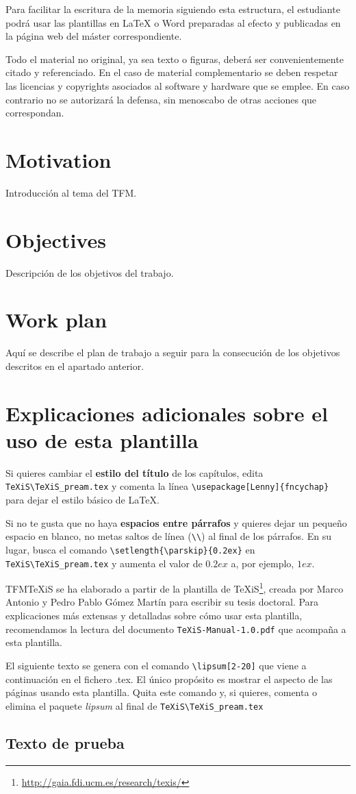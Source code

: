 Para facilitar la escritura de la memoria siguiendo esta estructura, el estudiante podrá usar las plantillas en LaTeX o Word preparadas al efecto y publicadas en la página web del máster correspondiente.

Todo el material no original, ya sea texto o figuras, deberá ser convenientemente citado y referenciado. En el caso de material complementario se deben respetar las licencias y copyrights asociados al software y hardware que se emplee. En caso contrario no se autorizará la defensa, sin menoscabo de otras acciones que correspondan.


\section{Motivation}
Introducción al tema del TFM.


\section{Objectives}
Descripción de los objetivos del trabajo.


\section{Work plan}
Aquí se describe el plan de trabajo a seguir para la consecución de los objetivos descritos en el apartado anterior.



\section{Explicaciones adicionales sobre el uso de esta plantilla}
Si quieres cambiar el \textbf{estilo del título} de los capítulos, edita \verb|TeXiS\TeXiS_pream.tex| y comenta la línea \verb|\usepackage[Lenny]{fncychap}| para dejar el estilo básico de \LaTeX.

Si no te gusta que no haya \textbf{espacios entre párrafos} y quieres dejar un pequeño espacio en blanco, no metas saltos de línea (\verb|\\|) al final de los párrafos. En su lugar, busca el comando  \verb|\setlength{\parskip}{0.2ex}| en \verb|TeXiS\TeXiS_pream.tex| y aumenta el valor de $0.2ex$ a, por ejemplo, $1ex$.

TFMTeXiS se ha elaborado a partir de la plantilla de TeXiS\footnote{\url{http://gaia.fdi.ucm.es/research/texis/}}, creada por Marco Antonio y Pedro Pablo Gómez Martín para escribir su tesis doctoral. Para explicaciones más extensas y detalladas sobre cómo usar esta plantilla, recomendamos la lectura del documento \texttt{TeXiS-Manual-1.0.pdf} que acompaña a esta plantilla.

El siguiente texto se genera con el comando \verb|\lipsum[2-20]| que viene a continuación en el fichero .tex. El único propósito es mostrar el aspecto de las páginas usando esta plantilla. Quita este comando y, si quieres, comenta o elimina el paquete \textit{lipsum} al final de \verb|TeXiS\TeXiS_pream.tex|

\subsection{Texto de prueba}


\lipsum[2-20]
